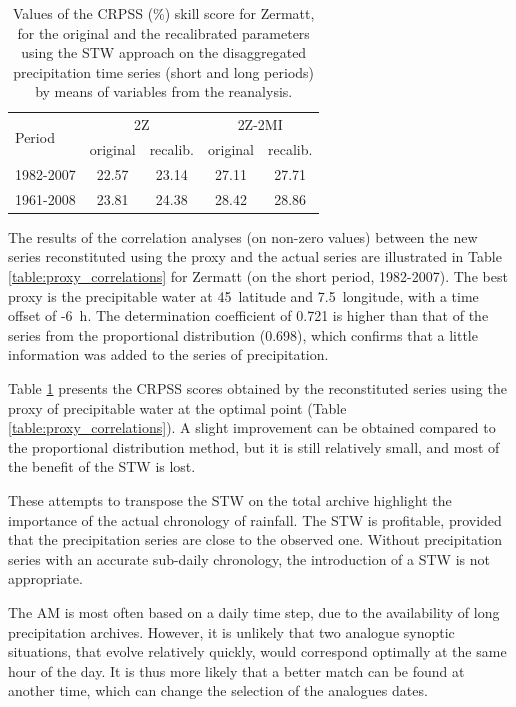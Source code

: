 \documentclass[hess]{copernicus}
\begin{document}
\begin{table}[htb]
	\caption{Values of the CRPSS (\%) skill score for Zermatt, for the original and the recalibrated parameters using the STW approach on the disaggregated precipitation time series (short and long periods) by means of variables from the reanalysis.}
	\begin{center}
		\begin{tabular}{l c c c c}
			\hline
			\multirow{2}{*}{Period} & \multicolumn{2}{c}{2Z} & \multicolumn{ 2}{c}{2Z-2MI} \\
			& original & recalib. & original & recalib. \\
			\hline
			1982-2007 & 22.57 & 23.14 & 27.11 & 27.71 \\
			1961-2008 & 23.81 & 24.38 & 28.42 & 28.86 \\
			\hline
		\end{tabular}
	\end{center}
	\label{table:proxy_CRPSS}
\end{table}

The results of the correlation analyses (on non-zero values) between the new series reconstituted using the proxy and the actual series are illustrated in Table \ref{table:proxy_correlations} for Zermatt (on the short period, 1982-2007). The best proxy is the precipitable water at 45\textdegree\ latitude and 7.5\textdegree\ longitude, with a time offset of -6~h. The determination coefficient of 0.721 is higher than that of the series from the proportional distribution (0.698), which confirms that a little information was added to the series of precipitation.

Table \ref{table:proxy_CRPSS} presents the CRPSS scores obtained by the reconstituted series using the proxy of precipitable water at the optimal point (Table \ref{table:proxy_correlations}). A slight improvement can be obtained compared to the proportional distribution method, but it is still relatively small, and most of the benefit of the STW is lost.

These attempts to transpose the STW on the total archive highlight the importance of the actual chronology of rainfall. The STW is profitable, provided that the precipitation series are close to the observed one. Without precipitation series with an accurate sub-daily chronology, the introduction of a STW is not appropriate.


\conclusions  %

The AM is most often based on a daily time step, due to the availability of long precipitation archives. However, it is unlikely that two analogue synoptic situations, that evolve relatively quickly, would correspond optimally at the same hour of the day. It is thus more likely that a better match can be found at another time, which can change the selection of the analogues dates.
\end{document}
